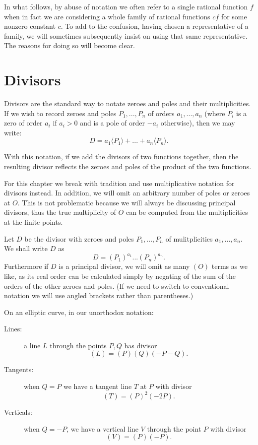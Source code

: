 In what follows,
by abuse of notation we often refer to a single rational function
$f$ when in fact we are considering a whole family of rational functions
$c f$ for some nonzero constant $c$. To add to the confusion, having
chosen a representative of a family, we will sometimes subsequently
insist on using that same representative. The reasons for doing so
will become clear.

\section {Divisors}

Divisors are the standard way
to notate zeroes and poles and their multiplicities.
If we wish to record zeroes and poles $P_1,...,P_n$
of orders $a_1,...,a_n$ (where $P_i$ is a zero of order
$a_i$ if $a_i > 0$ and is a pole of order $-a_i$ otherwise), then
we may write:
\[ D = a_1\langle P_1\rangle + ... + a_n \langle P_n\rangle .\]

With this notation, if we add the divisors of two functions together,
then the resulting divisor reflects the zeroes and poles of the product
of the two functions.

For this chapter we break with tradition and use multiplicative
notation for divisors instead. In addition, we will omit an arbitrary
number of poles or zeroes at $O$. This is not problematic because we
will always be discussing principal divisors, thus the true multiplicity
of $O$ can be computed from the multiplicities at the finite points.

Let $D$ be the divisor with zeroes and poles $P_1,...,P_n$
of mulitplicities $a_1,...,a_n$.
We shall write $D$ as
\[ D = (P_1)^{a_1} ... (P_n)^{a_n} . \]
Furthermore if $D$ is a principal divisor, we will
omit as many $(O)$ terms as we like, as its real order
can be calculated simply by negating
of the sum of the orders of the other zeroes and poles.
(If we need to switch to conventional notation we will use angled brackets
rather than parentheses.)

On an elliptic curve, in our unorthodox notation:
\begin{description}
\item[Lines:]
a line $L$ through the points $P, Q$ has divisor
\[ (L) = (P)(Q)(-P-Q) . \]
\item[Tangents:]
when $Q = P$ we have a tangent line $T$ at $P$ with divisor
\[ (T) = (P)^2 (-2P) . \]
\item[Verticals:]
when $Q = -P$, we have a vertical line $V$ through the point $P$
with divisor
\[ (V) = (P)(-P) . \]
\end{description}

